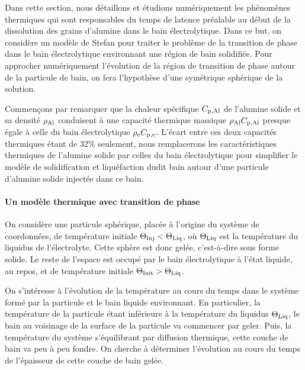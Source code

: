 Dans cette section, nous détaillons et étudions numériquement les
phénomènes thermiques qui sont responsables du temps de latence
préalable au début de la dissolution des grains d'alumine dans le bain
électrolytique. Dans ce but, on considère un modèle de Stefan pour
traiter le problème de la transition de phase dans le bain
électrolytique environnant une région de bain solidifiée. Pour
approcher numériquement l'évolution de la région de transition de
phase autour de la particule de bain, on fera l'hypothèse d'une
symétrique sphérique de la solution.

Commençons par remarquer que la chaleur spécifique $C_{\mathrm{p,Al}}$ de
l'alumine solide et sa densité $\rho_\mathrm{Al}$ conduisent à une
capacité thermique massique $\rho_\mathrm{Al}C_{\mathrm{p,Al}}$ presque égale
à celle du bain électrolytique
$\rho_\mathrm{e}C_{\mathrm{p,e}}$. L'écart entre ces deux capacités
thermiques étant de \num{32}\% seulement, nous remplacerons les
caractéristiques thermiques de l'alumine solide par celles du bain
électrolytique pour simplifier le modèle de solidification et
liquéfaction dudit bain autour d'une particule d'alumine solide
injectée dans ce bain.


\paragraph{Un modèle thermique avec transition de phase}
On considère une particule sphérique, placée à l'origine du système de
coordonnées, de température initiale $\Theta_\text{Inj}<\Theta_\text{Liq}$, où $\Theta_\text{Liq}$ est la
température du liquidus de l'électrolyte. Cette sphère est donc gelée,
c'est-à-dire sous forme solide. Le reste de l'espace est occupé par le
bain électrolytique à l'état liquide, au repos, et de température
initiale $\Theta_\text{Init} > \Theta_\text{Liq}$.

On s'intéresse à l'évolution de la température au cours du temps dans
le système formé par la particule et le bain liquide environnant. En
particulier, la température de la particule étant inférieure à la
température du liquidus $\Theta_\text{Liq}$, le bain au voisinage de la surface de
la particule va commencer par geler. Puis, la température du système
s'équilibrant par diffusion thermique, cette couche de bain va peu à
peu fondre. On cherche à déterminer l'évolution au cours du temps de
l'épaisseur de cette couche de bain gelée.

